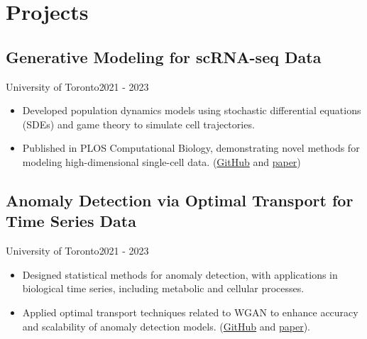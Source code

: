 \section{Projects}
\subsection{Generative Modeling for scRNA-seq Data}{University of Toronto}{2021 - 2023}
\begin{itemize}[leftmargin=*]
    \item Developed population dynamics models using stochastic differential equations (SDEs) and game theory to simulate cell trajectories.
    \item Published in PLOS Computational Biology, demonstrating novel methods for modeling high-dimensional single-cell data. (\href{https://github.com/Diebrate/population_model}{GitHub} and \href{https://journals.plos.org/ploscompbiol/article?id=10.1371/journal.pcbi.1012015}{paper})
\end{itemize}

\subsection{Anomaly Detection via Optimal Transport for Time Series Data}{University of Toronto}{2021 - 2023}
\begin{itemize}[leftmargin=*]
    \item Designed statistical methods for anomaly detection, with applications in biological time series, including metabolic and cellular processes.
    \item Applied optimal transport techniques related to WGAN to enhance accuracy and scalability of anomaly detection models. (\href{https://github.com/Diebrate/scRNA_study}{GitHub} and \href{hhttps://arxiv.org/abs/2501.03501}{paper}).
\end{itemize}
